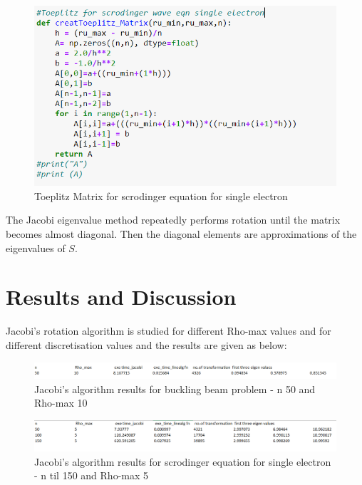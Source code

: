 \documentclass{article}
\begin{document}
\begin{figure}[H]
 	 \includegraphics[width=\linewidth]{toeplitzscrodingersingleelec.png}
	\caption{Toeplitz Matrix for scrodinger equation for single electron}
  \label{fig:schro}
\end{figure}

The Jacobi eigenvalue method repeatedly performs rotation until the matrix becomes almost diagonal. Then
the diagonal elements are approximations of the eigenvalues of $S$.

\section{Results and Discussion}
Jacobi's rotation algorithm is studied for different Rho-max values and for different discretisation values and the results are given as below:
\begin{figure}[H]
 	 \includegraphics[width=\linewidth]{buckbeamtime.png}
	\caption{Jacobi's algorithm results for buckling beam problem  - n 50 and Rho-max 10}
  \label{fig:results for buckling beam problem}
\end{figure}

\begin{figure}[H]
 	 \includegraphics[width=\linewidth]{timerhomax5n150.png}
	\caption{Jacobi's algorithm results for scrodinger equation for single electron - n til 150 and Rho-max 5}
  \label{fig:results for buckling beam problem}
\end{figure}
\end{document}
